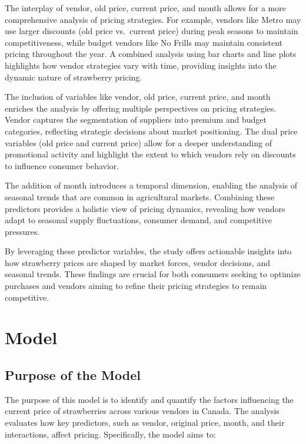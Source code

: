 \documentclass[
  letterpaper,
  DIV=11,
  numbers=noendperiod]{scrartcl}
\begin{document}
The interplay of vendor, old price, current price, and month allows for
a more comprehensive analysis of pricing strategies. For example,
vendors like Metro may use larger discounts (old price vs.~current
price) during peak seasons to maintain competitiveness, while budget
vendors like No Frills may maintain consistent pricing throughout the
year. A combined analysis using bar charts and line plots highlights how
vendor strategies vary with time, providing insights into the dynamic
nature of strawberry pricing.

The inclusion of variables like vendor, old price, current price, and
month enriches the analysis by offering multiple perspectives on pricing
strategies. Vendor captures the segmentation of suppliers into premium
and budget categories, reflecting strategic decisions about market
positioning. The dual price variables (old price and current price)
allow for a deeper understanding of promotional activity and highlight
the extent to which vendors rely on discounts to influence consumer
behavior.

The addition of month introduces a temporal dimension, enabling the
analysis of seasonal trends that are common in agricultural markets.
Combining these predictors provides a holistic view of pricing dynamics,
revealing how vendors adapt to seasonal supply fluctuations, consumer
demand, and competitive pressures.

By leveraging these predictor variables, the study offers actionable
insights into how strawberry prices are shaped by market forces, vendor
decisions, and seasonal trends. These findings are crucial for both
consumers seeking to optimize purchases and vendors aiming to refine
their pricing strategies to remain competitive.

\section{Model}\label{sec-model}

\subsection{Purpose of the Model}\label{purpose-of-the-model}

The purpose of this model is to identify and quantify the factors
influencing the current price of strawberries across various vendors in
Canada. The analysis evaluates how key predictors, such as vendor,
original price, month, and their interactions, affect pricing.
Specifically, the model aims to:
\end{document}
